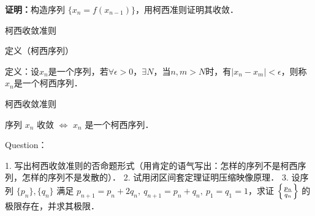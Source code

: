   \textbf{证明：}构造序列 $\{x_n=f(x_{n-1})\}$，用柯西准则证明其收敛．

柯西收敛准则

定义（柯西序列）

    定义：设{$x_n$}是一个序列，若$\forall\epsilon>0$，$\exists N$，当$n,m>N$时，有$\vert x_n-x_m\vert<\epsilon$，则称{$x_n$}是一个柯西序列．

柯西收敛准则

    序列 {$x_n$} 收敛 $\Leftrightarrow$ {$x_n$} 是一个柯西序列．

Question：

  1. 写出柯西收敛准则的否命题形式（用肯定的语气写出：怎样的序列不是柯西序列，怎样的序列不是发散的）．
  2. 试用闭区间套定理证明压缩映像原理．
  3. 设序列 $\{p_n\}, \{q_n\}$ 满足 $p_{n+1}=p_n+2q_n,\ q_{n+1}=p_n+q_n,\ p_1=q_1=1$，求证 $\left\{\large\frac{p_n}{q_n}\right\}$ 的极限存在，并求其极限．